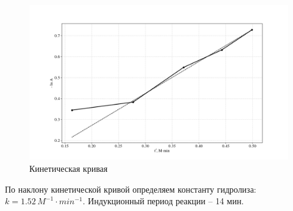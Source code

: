 \documentclass[12pt]{article}
\begin{document}
\begin{figure}[!ht]
	\includegraphics[width = \linewidth]{../kinetic.png}
	\caption{Кинетическая кривая}
\end{figure}

По наклону кинетической кривой определяем константу гидролиза: $k = 1.52 \, M^{-1} \cdot min^{-1}$. Индукционный период реакции -- 14 мин.
\end{document}
